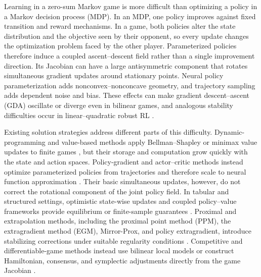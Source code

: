 \documentclass{article}
\theoremstyle{remark}
\begin{document}
Learning in a zero-sum Markov game is more difficult than optimizing a policy in a Markov decision process (MDP).
In an MDP, one policy improves against fixed transition and reward mechanisms.
In a game, both policies alter the state distribution and the objective seen by their opponent, so every update changes the optimization problem faced by the other player.
Parameterized policies therefore induce a coupled ascent--descent field rather than a single improvement direction.
Its Jacobian can have a large antisymmetric component that rotates simultaneous gradient updates around stationary points.
Neural policy parameterization adds nonconvex--nonconcave geometry, and trajectory sampling adds dependent noise and bias.
These effects can make gradient descent--ascent (GDA) oscillate or diverge even in bilinear games, and analogous stability difficulties occur in linear--quadratic robust RL \citep{ZhangHuBasar2020StabilityRARL}.

Existing solution strategies address different parts of this difficulty.
Dynamic-programming and value-based methods apply Bellman--Shapley or minimax value updates to finite games \citep{Shapley1953StochasticGames,Littman1994MarkovGames,Iyengar2005RobustDP,NilimElGhaoui2005}, but their storage and computation grow quickly with the state and action spaces.
Policy-gradient and actor--critic methods instead optimize parameterized policies from trajectories and therefore scale to neural function approximation \citep{Sutton2000PolicyGradient,Alacaoglu2022NACMG}.
Their basic simultaneous updates, however, do not correct the rotational component of the joint policy field.
In tabular and structured settings, optimistic state-wise updates and coupled policy--value frameworks provide equilibrium or finite-sample guarantees \citep{Wei2021OptimisticMG,Zhao2022ProvablyEfficientMG,Zhang2022UnifiedMG}.
Proximal and extrapolation methods, including the proximal point method (PPM), the extragradient method (EGM), Mirror-Prox, and policy extragradient, introduce stabilizing corrections under suitable regularity conditions \citep{Rockafellar1976PPM,Korpelevich1976Extragradient,Nemirovski2004MirrorProx,Mokhtari2020UnifiedEG,CenWeiChi2024FastPolicyEG}.
Competitive and differentiable-game methods instead use bilinear local models or construct Hamiltonian, consensus, and symplectic adjustments directly from the game Jacobian \citep{Prajapat2021CoPO,Balduzzi2018Mechanics,Letcher2019DifferentiableGameMechanics,Mescheder2018GANConvergence,Loizou2020SHGD}.
\end{document}
